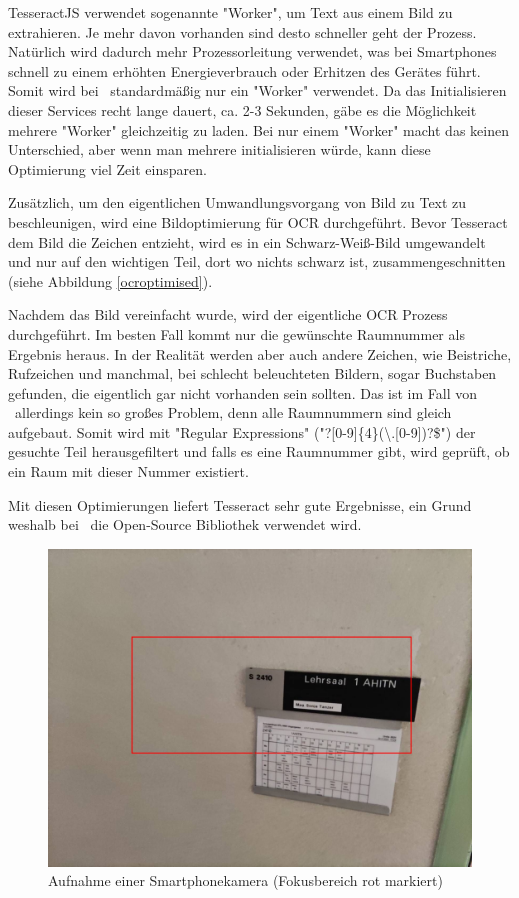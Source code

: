 
TesseractJS verwendet sogenannte "Worker", um Text aus einem Bild zu extrahieren. Je mehr davon vorhanden sind desto schneller geht der Prozess. Natürlich wird dadurch mehr Prozessorleitung verwendet, was bei Smartphones schnell zu einem erhöhten Energieverbrauch oder Erhitzen des Gerätes führt. Somit wird bei \ZELIA\ standardmäßig nur ein "Worker" verwendet. Da das Initialisieren dieser Services recht lange dauert, ca. 2-3 Sekunden, gäbe es die Möglichkeit mehrere "Worker" gleichzeitig zu laden. Bei nur einem "Worker" macht das keinen Unterschied, aber wenn man mehrere initialisieren würde, kann diese Optimierung viel Zeit einsparen.

Zusätzlich, um den eigentlichen Umwandlungsvorgang von Bild zu Text zu beschleunigen, wird eine Bildoptimierung für OCR durchgeführt. Bevor Tesseract dem Bild die Zeichen entzieht, wird es in ein Schwarz-Weiß-Bild umgewandelt und nur auf den wichtigen Teil, dort wo nichts schwarz ist, zusammengeschnitten (siehe Abbildung \ref{ocroptimised}).

Nachdem das Bild vereinfacht wurde, wird der eigentliche OCR Prozess durchgeführt. Im besten Fall kommt nur die gewünschte Raumnummer als Ergebnis heraus. In der Realität werden aber auch andere Zeichen, wie Beistriche, Rufzeichen und manchmal, bei schlecht beleuchteten Bildern, sogar Buchstaben gefunden, die eigentlich gar nicht vorhanden sein sollten. Das ist im Fall von \ZELIA\ allerdings kein so großes Problem, denn alle Raumnummern sind gleich aufgebaut. Somit wird mit "Regular Expressions" ("{\ttfamily [A-Z]?[0-9]\{4\}(\textbackslash.[0-9])?\$}") der gesuchte Teil herausgefiltert und falls es eine Raumnummer gibt, wird geprüft, ob ein Raum mit dieser Nummer existiert.

Mit diesen Optimierungen liefert Tesseract sehr gute Ergebnisse, ein Grund weshalb bei \ZELIA\ die Open-Source Bibliothek verwendet wird.


\begin{figure}
    \centering
    \includegraphics[width=120mm]{media/OCR/original}
    \caption{Aufnahme einer Smartphonekamera (Fokusbereich rot markiert)}
    \label{fig:phonecam}
\end{figure}


